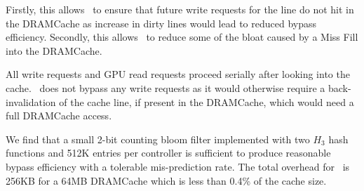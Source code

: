 Firstly, this allows \bypassname\ to ensure that future write requests for the line do not hit in the DRAMCache as increase in dirty lines would lead to reduced bypass efficiency. 
Secondly, this allows \bypassname\ to reduce some of the bloat caused by a Miss Fill \cite{bear} into the DRAMCache.
\par All write requests and GPU read requests proceed serially after looking into the cache. \bypassname\ does not bypass any write requests as it would otherwise require a back-invalidation of the cache line, if present in the DRAMCache, which would need a full DRAMCache access.
\par We find that a small 2-bit counting bloom filter implemented with two $H_3$ hash functions \cite{h3} and 512K entries per controller is sufficient 
to produce reasonable bypass efficiency with a tolerable mis-prediction rate. The total overhead for \bypassname\ is 256KB for a 64MB DRAMCache which is less than 0.4\% of the cache size.


